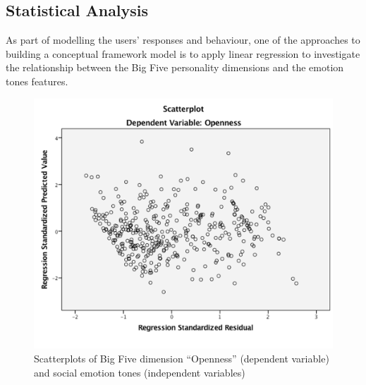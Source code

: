 \documentclass[graybox]{svmult}
\begin{document}
{\subsection{Statistical Analysis}

As part of modelling the users' responses and behaviour, one of the
approaches to building a conceptual framework model is to apply linear
regression to investigate the relationship between the Big Five
personality dimensions and the emotion tones features.



\begin{figure}[H]
\centering
\includegraphics[width=0.8\columnwidth]{images/opennessplot.png}
\caption{Scatterplots of Big Five dimension ``Openness'' (dependent variable) and
  social emotion tones (independent variables)}
\label{fig:opennessplot} 
\end{figure}

}
\end{document}
